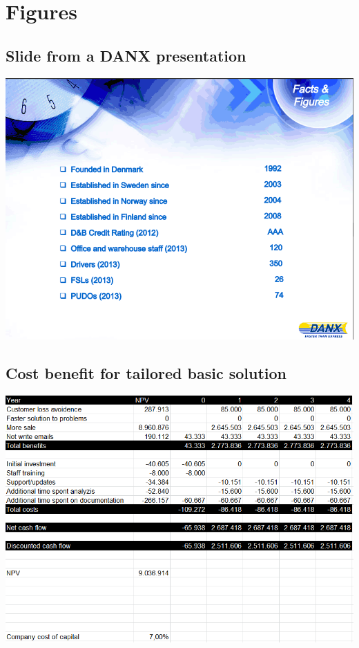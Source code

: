 \chapter{Figures}

\section{Slide from a DANX presentation}
\label{sec:slide_from_DANX}
\includegraphics[width=\textwidth]{img/DANX_FSL_PUDO}


\section{Cost benefit for tailored basic solution}
\label{sec:cost_tailored_basic}
\includegraphics[width=\textwidth]{img/CostBenefit_TailoredBasic}


